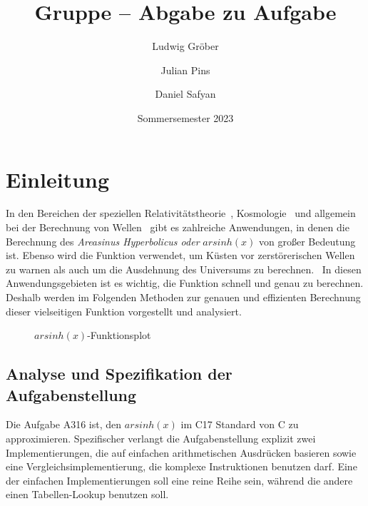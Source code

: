 \documentclass[course=erap] {aspdoc}
\author{Ludwig Gröber \and Julian Pins \and Daniel Safyan}
\date{Sommersemester 2023} %
\title{Gruppe \theGroup{} -- Abgabe zu Aufgabe \theNumber}
\begin{document}
    \maketitle


    \section{Einleitung}\label{sec:einleitung}

    In den Bereichen der speziellen Relativitätstheorie~\cite{relativity}, Kosmologie~\cite{universum1,universum2} und allgemein bei der Berechnung von Wellen~\cite{linear_waves} gibt es zahlreiche Anwendungen, in denen die Berechnung des \textit{Areasinus Hyperbolicus oder} $arsinh(x)$ von großer Bedeutung ist.
    Ebenso wird die Funktion verwendet, um Küsten vor zerstörerischen Wellen zu warnen als auch um die Ausdehnung des Universums zu berechnen.~\cite{universum1,universum2}
    In diesen Anwendungsgebieten ist es wichtig, die Funktion schnell und genau zu berechnen.
    Deshalb werden im Folgenden Methoden zur genauen und effizienten Berechnung dieser vielseitigen Funktion vorgestellt und analysiert.
    \begin{figure}[h]
        \caption{$arsinh(x)$-Funktionsplot}
    \end{figure}

    \subsection{Analyse und Spezifikation der Aufgabenstellung}\label{subsec:analyse-und-spezifikation-der-aufgabenstellung}

    Die Aufgabe A316 ist, den $arsinh(x)$ im C17 Standard von C zu approximieren.
    Spezifischer verlangt die Aufgabenstellung explizit zwei Implementierungen, die auf einfachen arithmetischen Ausdrücken basieren sowie eine Vergleichsimplementierung, die komplexe Instruktionen benutzen darf.
    Eine der einfachen Implementierungen soll eine reine Reihe sein, während die andere einen Tabellen-Lookup benutzen soll.
\end{document}
